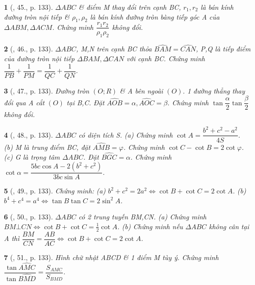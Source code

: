 \documentclass{article}
\newtheorem{baitoan}{}
\begin{document}
\begin{baitoan}[\cite{TLCT_hinh_hoc_10}, 45., p. 133]
	$\Delta ABC$ \& điểm M thay đổi trên cạnh BC, $r_1,r_2$ là bán kính đường tròn nội tiếp \& $\rho_1,\rho_2$ là bán kính đường tròn bàng tiếp góc A của $\Delta ABM,\Delta ACM$. Chứng minh $\dfrac{r_1r_2}{\rho_1\rho_2}$ không đổi.
\end{baitoan}

\begin{baitoan}[\cite{TLCT_hinh_hoc_10}, 46., p. 133]
	$\Delta ABC$, M,N trên cạnh BC thỏa $\widehat{BAM} = \widehat{CAN}$, P,Q là tiếp điểm của đường tròn nội tiếp $\Delta BAM,\Delta CAN$ với cạnh BC. Chứng minh $\dfrac{1}{PB} + \dfrac{1}{PM} = \dfrac{1}{QC} + \dfrac{1}{QN}$.
\end{baitoan}

\begin{baitoan}[\cite{TLCT_hinh_hoc_10}, 47., p. 133]
	Đường tròn $(O;R)$ \& A bên ngoài $(O)$. 1 đường thẳng thay đổi qua A cắt $(O)$ tại B,C. Đặt $\widehat{AOB} = \alpha,\widehat{AOC} = \beta$. Chứng minh $\tan\dfrac{\alpha}{2}\tan\dfrac{\beta}{2}$ không đổi.
\end{baitoan}

\begin{baitoan}[\cite{TLCT_hinh_hoc_10}, 48., p. 133]
	$\Delta ABC$ có diện tích S. (a) Chứng minh $\cot A = \dfrac{b^2 + c^2 - a^2}{4S}$. (b) M là trung điểm BC, đặt $\widehat{AMB} = \varphi$. Chứng minh $\cot C - \cot B = 2\cot\varphi$. (c) G là trọng tâm $\Delta ABC$. Đặt $\widehat{BGC} = \alpha$. Chứng minh $\cot\alpha = \dfrac{5bc\cos A - 2(b^2 + c^2)}{3bc\sin A}$.
\end{baitoan}

\begin{baitoan}[\cite{TLCT_hinh_hoc_10}, 49., p. 133]
	Chứng minh: (a) $b^2 + c^2 = 2a^2\Leftrightarrow\cot B + \cot C = 2\cot A$. (b) $b^4 + c^4 = a^4\Leftrightarrow\tan B\tan C = 2\sin^2A$.
\end{baitoan}

\begin{baitoan}[\cite{TLCT_hinh_hoc_10}, 50., p. 133]
	$\Delta ABC$ có 2 trung tuyến BM,CN. (a) Chứng minh $BM\bot CN\Leftrightarrow\cot B + \cot C = \frac{1}{2}\cot A$. (b) Chứng minh nếu $\Delta ABC$ không cân tại A thì $\dfrac{BM}{CN} = \dfrac{AB}{AC}\Leftrightarrow\cot B + \cot C = 2\cot A$.
\end{baitoan}

\begin{baitoan}[\cite{TLCT_hinh_hoc_10}, 51., p. 133]
	Hình chữ nhật ABCD \& 1 điểm M tùy ý. Chứng minh $\dfrac{\tan\widehat{AMC}}{\tan\widehat{BMD}} = \dfrac{S_{AMC}}{S_{BMD}}$.
\end{baitoan}
\end{document}
